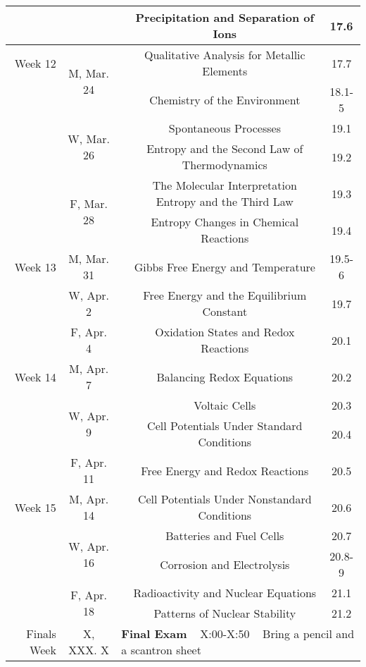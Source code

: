 \begin{tabular}{rcccc}
& & & Precipitation and Separation of Ions & 17.6\\
\midrule
Week 12 & \multirow{2}{*}{M, Mar. 24}& & Qualitative Analysis for Metallic Elements & 17.7\\
& & & Chemistry of the Environment & 18.1-5\\
& \multirow{2}{*}{W, Mar. 26}& & Spontaneous Processes & 19.1\\
& & & Entropy and the Second Law of Thermodynamics & 19.2\\
& \multirow{2}{*}{F, Mar. 28}& & The Molecular Interpretation Entropy and the Third Law & 19.3\\
& & & Entropy Changes in Chemical Reactions & 19.4\\
\midrule
Week 13 & M, Mar. 31&& Gibbs Free Energy and Temperature & 19.5-6\\
& W, Apr. 2&& Free Energy and the Equilibrium Constant & 19.7\\
& F, Apr. 4&& Oxidation States and Redox Reactions & 20.1\\
\midrule
Week 14 & M, Apr. 7&& Balancing Redox Equations & 20.2\\
& \multirow{2}{*}{W, Apr. 9}& & Voltaic Cells & 20.3\\
& & & Cell Potentials Under Standard Conditions & 20.4\\
& F, Apr. 11&& Free Energy and Redox Reactions & 20.5\\
\midrule
Week 15 & M, Apr. 14&& Cell Potentials Under Nonstandard Conditions & 20.6\\
& \multirow{2}{*}{W, Apr. 16}& & Batteries and Fuel Cells & 20.7\\
& & & Corrosion and Electrolysis & 20.8-9\\
& \multirow{2}{*}{F, Apr. 18}& & Radioactivity and Nuclear Equations & 21.1\\
& & & Patterns of Nuclear Stability & 21.2\\
\midrule
\midrule
Finals Week & X, XXX. X & \multicolumn{3}{l}{\textbf{Final Exam} ~ X:00-X:50 ~ Bring a pencil and a scantron sheet}\\
\end{tabular}